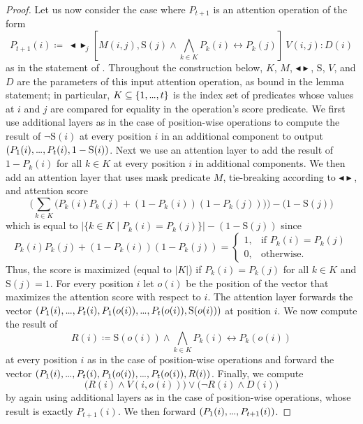 \documentclass{article} %
\newcommand{\minatt}{\blacktriangleleft}
\newcommand{\maxatt}{\blacktriangleright}
\newcommand{\minmaxatt}{\minatt\!\maxatt}
\newcommand{\score}{\mathrm{S}}
\newcommand{\bnfdef}{\coloneqq}
\newcommand{\mydots}{%
  \ifmmode
    \mathord{.}\mkern-1mu\mathord{.}\mkern-1mu\mathord{.}%
  \else
    .\kern-0.1em.\kern-0.1em.%
  \fi
}
\renewcommand{\dots}{\mydots}%
\begin{document}
\begin{proof}
Let us now consider the case where $P_{t+1}$ is an attention operation of the form
\begin{equation}
P_{t+1}(i) \bnfdef\ \minmaxatt_j [M(i,j),  \score(j) \wedge \bigwedge_{k \in K} P_k(i) \leftrightarrow P_k(j)]\ V(i,j) : D(i)
\end{equation}
as in the statement of .
Throughout the construction below, $K$, $M$, $\minmaxatt$, $\score$, $V$, and $D$ are the parameters of this input attention operation, as bound in the lemma statement; in particular, $K \subseteq \{1, \dots, t\}$ is the index set of predicates whose values at $i$ and $j$ are compared for equality in the operation's score predicate.
We first use additional layers as in the case of position-wise operations to compute the result of $\neg \score(i)$
at every position $i$ in an additional component to output $(P_1(i),\dots,P_{t}(i),1 - \score(i))$.
Next we use an attention layer to add the result of $1-P_k(i)$ for all $k \in K$ at every position $i$ in additional components.
We then add an attention layer that uses mask predicate $M$, tie-breaking according to $\minmaxatt$, and attention score
\begin{equation}
\Big(\sum_{k \in K} \big(P_k(i) P_k(j) + (1-P_k(i))(1-P_k(j))\big)\Big) - \big(1-\score(j)\big)
\end{equation}
which is equal to $|\{k \in K \mid P_k(i) = P_k(j)\}| - (1-\score(j))$ since
\begin{equation}
P_k(i) P_k(j) + (1-P_k(i))(1-P_k(j)) = \begin{cases}
1, &\text{if } P_k(i) = P_k(j)\\
0, &\text{otherwise.}
\end{cases}
\end{equation}
Thus, the score is maximized (equal to $|K|$) if $P_k(i) = P_k(j)$ for all $k \in K$ and $\score(j) = 1$.
For every position $i$ let $o(i)$ be the position of the vector that maximizes the attention score with respect to $i$.
The attention layer forwards the vector $(P_1(i),\dots,P_t(i),P_1(o(i)),\dots,P_t(o(i)),\score(o(i)))$ at position $i$.
We now compute the result of
\begin{equation}
R(i) \bnfdef \score(o(i)) \wedge \bigwedge_{k \in K} P_k(i) \leftrightarrow P_k(o(i))
\end{equation}
at every position $i$ as in the case of position-wise operations and
forward the vector $(P_1(i),\dots,P_t(i),P_1(o(i)),\dots,P_t(o(i)),R(i))$.
Finally, we compute
\begin{equation}
\big(R(i) \wedge V(i,o(i))\big) \vee \big(\neg R(i) \wedge D(i)\big)
\end{equation}
by again using additional layers as in the case of position-wise operations,
whose result is exactly $P_{t+1}(i)$.
We then forward $(P_1(i),\dots,P_{t+1}(i))$.


\end{proof}
\end{document}
